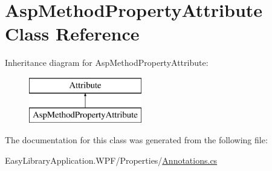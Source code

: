 \hypertarget{class_asp_method_property_attribute}{}\section{Asp\+Method\+Property\+Attribute Class Reference}
\label{class_asp_method_property_attribute}
Inheritance diagram for Asp\+Method\+Property\+Attribute\+:\begin{figure}[H]
\begin{center}
\leavevmode
\includegraphics[height=2.000000cm]{class_asp_method_property_attribute}
\end{center}
\end{figure}


The documentation for this class was generated from the following file\+:\begin{DoxyCompactItemize}
\item 
Easy\+Library\+Application.\+W\+P\+F/\+Properties/\mbox{\hyperlink{_annotations_8cs}{Annotations.\+cs}}\end{DoxyCompactItemize}
